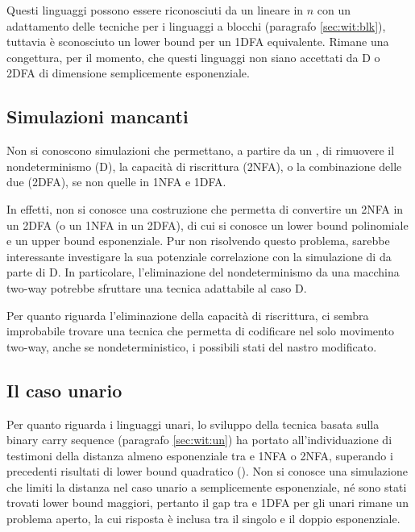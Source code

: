 Questi linguaggi possono essere riconosciuti da un  lineare in $n$ con un adattamento delle tecniche per i linguaggi a blocchi (paragrafo \ref{sec:wit:blk}), tuttavia è sconosciuto un lower bound per un 1DFA equivalente. Rimane una congettura, per il momento, che questi linguaggi non siano accettati da D o 2DFA di dimensione semplicemente esponenziale.


\subsection{Simulazioni mancanti}
Non si conoscono simulazioni che permettano, a partire da un , di rimuovere il nondeterminismo (\tto D), la capacità di riscrittura (\tto 2NFA), o la combinazione delle due (\tto 2DFA), se non quelle in 1NFA e 1DFA.

In effetti, non si conosce una costruzione che permetta di convertire un 2NFA in un 2DFA (o un 1NFA in un 2DFA), di cui si conosce un lower bound polinomiale e un upper bound esponenziale. Pur non risolvendo questo problema, sarebbe interessante investigare la sua potenziale correlazione con la simulazione di  da parte di D. In particolare, l'eliminazione del nondeterminismo da una macchina two-way potrebbe sfruttare una tecnica adattabile al caso \tto D.

Per quanto riguarda l'eliminazione della capacità di riscrittura, ci sembra improbabile trovare una tecnica che permetta di codificare nel solo movimento two-way, anche se nondeterministico, i possibili stati del nastro modificato.


\subsection{Il caso unario}
Per quanto riguarda i linguaggi unari, lo sviluppo della tecnica basata sulla binary carry sequence (paragrafo \ref{sec:wit:un}) ha portato all'individuazione di testimoni della distanza almeno esponenziale tra  e 1NFA o 2NFA, superando i precedenti risultati di lower bound quadratico (\cite{Pighizzini:14:limitedRE}). Non si conosce una simulazione che limiti la distanza nel caso unario a semplicemente esponenziale, né sono stati trovati lower bound maggiori, pertanto il gap tra  e 1DFA per gli unari rimane un problema aperto, la cui risposta è inclusa tra il singolo e il doppio esponenziale.


